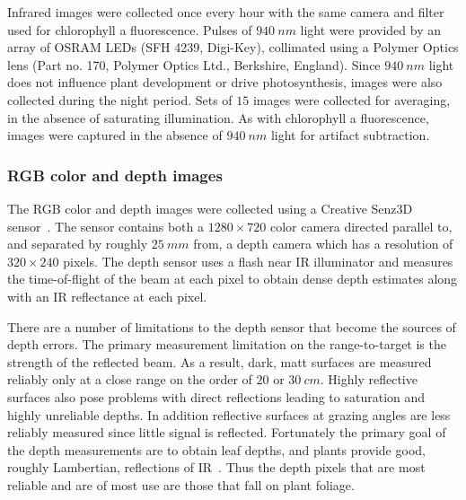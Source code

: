 Infrared images were collected once every hour with the same camera and filter used for chlorophyll a fluorescence.  
Pulses of $940~nm$ light were provided by an array of OSRAM LEDs (SFH 4239, Digi-Key), collimated using a Polymer Optics lens (Part no. 170, Polymer Optics Ltd., Berkshire, England).  
Since $940~nm$ light does not influence plant development or drive photosynthesis, images were also collected during the night period.  
Sets of $15$ images were collected for averaging, in the absence of saturating illumination.   
As with chlorophyll a fluorescence, images were captured in the absence of $940~nm$ light for artifact subtraction.



\subsubsection{RGB color and depth images} %

The RGB color and depth images were collected using a Creative Senz3D sensor~\cite{nguyen2015vietnamese}. The sensor contains both a $1280 \times 720$ color camera directed parallel to, and separated by roughly $25~mm$ from, a depth camera which has a resolution of $320\times240$ pixels. 
The depth sensor uses a flash near IR illuminator and measures the time-of-flight of the beam at each pixel to obtain dense depth estimates along with an IR reflectance at each pixel.

There are a number of limitations to the depth sensor that become the sources of depth errors. 
The primary measurement limitation on the range-to-target is the strength of the reflected beam. 
As a result, dark, matt surfaces are measured reliably only at a close range on the order of $20$ or $30~cm$.  
Highly reflective surfaces also pose problems with direct reflections leading to saturation and highly unreliable depths.  
In addition reflective surfaces at grazing angles are less reliably measured since little signal is reflected. 
Fortunately the primary goal of the depth measurements are to obtain leaf depths, and plants provide good, roughly Lambertian, reflections of IR~\cite{Chelle2006219}.  Thus the depth pixels that are most reliable and are of most use are those that fall on plant foliage.

